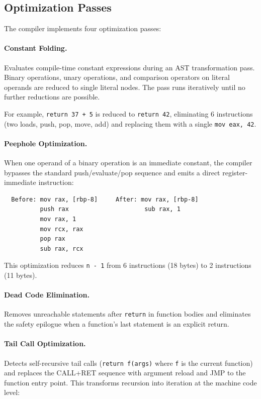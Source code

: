 \documentclass[11pt,a4paper]{article}
\begin{document}
\subsection{Optimization Passes}

The compiler implements four optimization passes:

\paragraph{Constant Folding.} Evaluates compile-time constant expressions during an AST transformation pass. Binary operations, unary operations, and comparison operators on literal operands are reduced to single literal nodes. The pass runs iteratively until no further reductions are possible.

For example, \texttt{return 37 + 5} is reduced to \texttt{return 42}, eliminating 6 instructions (two loads, push, pop, move, add) and replacing them with a single \texttt{mov eax, 42}.

\paragraph{Peephole Optimization.} When one operand of a binary operation is an immediate constant, the compiler bypasses the standard push/evaluate/pop sequence and emits a direct register-immediate instruction:

\begin{verbatim}
  Before: mov rax, [rbp-8]     After: mov rax, [rbp-8]
          push rax                     sub rax, 1
          mov rax, 1
          mov rcx, rax
          pop rax
          sub rax, rcx
\end{verbatim}

This optimization reduces \texttt{n~-~1} from 6 instructions (18 bytes) to 2 instructions (11 bytes).

\paragraph{Dead Code Elimination.} Removes unreachable statements after \texttt{return} in function bodies and eliminates the safety epilogue when a function's last statement is an explicit return.

\paragraph{Tail Call Optimization.} Detects self-recursive tail calls (\texttt{return f(args)} where \texttt{f} is the current function) and replaces the CALL+RET sequence with argument reload and JMP to the function entry point. This transforms recursion into iteration at the machine code level:
\end{document}

